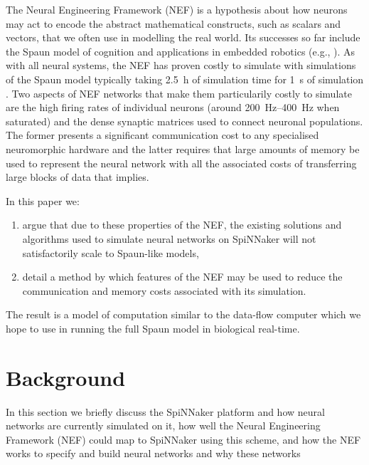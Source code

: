\documentclass[conference]{IEEEtran}
\begin{document}
  The Neural Engineering Framework (NEF) \parencite{Eliasmith2004} is a
  hypothesis about how neurons may act to encode the abstract mathematical
  constructs, such as scalars and vectors, that we often use in modelling the
  real world. Its successes so far include the Spaun model of cognition
  \parencite{Eliasmith2012} and applications in embedded robotics (e.g.,
  \parencite{Stewart2015ip}). As with all neural systems, the NEF has proven
  costly to simulate with simulations of the Spaun model typically taking
  \SI{2.5}{\hour} of simulation time for \SI{1}{\second} of simulation
  \parencite[\S V]{Stewart2014}. Two aspects of NEF networks that make them 
  particularily costly to simulate are the high firing rates of individual 
  neurons (around \SIrange{200}{400}{\hertz} when saturated) and the dense 
  synaptic matrices used to connect neuronal populations. The former 
  presents a significant communication cost to any specialised neuromorphic 
  hardware and the latter requires that large amounts of memory be used to 
  represent the neural network with all the associated costs of transferring 
  large blocks of data that implies.

  In this paper we:
  \begin{enumerate}
    \item argue that due to these properties of the NEF, the
      existing solutions and algorithms used to simulate neural networks on
      SpiNNaker will not satisfactorily scale to Spaun-like models,
    \item detail a method by which features of the NEF may be used to reduce
      the communication and memory costs associated with its simulation.
  \end{enumerate}

  The result is a model of computation similar to the data-flow computer which
  we hope to use in running the full Spaun model in biological real-time.

  \section{Background}

  In this section we briefly discuss the SpiNNaker platform and how neural
  networks are currently simulated on it, how well the Neural Engineering
  Framework (NEF) could map to SpiNNaker using this scheme, and how the NEF
  works to specify and build neural networks and why these networks
\end{document}
